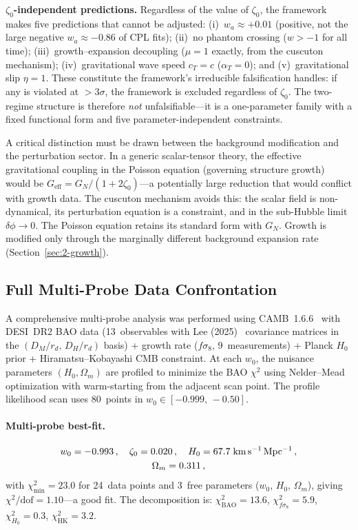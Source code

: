\textbf{$\zeta_0$-independent predictions.} Regardless of the value of $\zeta_0$, the framework makes five predictions that cannot be adjusted: (i)~$w_a \approx +0.01$ (positive, not the large negative $w_a \approx -0.86$ of CPL fits); (ii)~no phantom crossing ($w > -1$ for all time); (iii)~growth--expansion decoupling ($\mu = 1$ exactly, from the cuscuton mechanism); (iv)~gravitational wave speed $c_T = c$ ($\alpha_T = 0$); and (v)~gravitational slip $\eta = 1$. These constitute the framework's irreducible falsification handles: if any is violated at $>3\sigma$, the framework is excluded regardless of $\zeta_0$. The two-regime structure is therefore \emph{not} unfalsifiable---it is a one-parameter family with a fixed functional form and five parameter-independent constraints.

A critical distinction must be drawn between the background modification and the perturbation sector. In a generic scalar-tensor theory, the effective gravitational coupling in the Poisson equation (governing structure growth) would be $G_\mathrm{eff} = G_N/(1 + 2\zeta_0)$---a potentially large reduction that would conflict with growth data. The cuscuton mechanism avoids this: the scalar field is non-dynamical, its perturbation equation is a constraint, and in the sub-Hubble limit $\delta\phi \to 0$. The Poisson equation retains its standard form with $G_N$. Growth is modified only through the marginally different background expansion rate (Section~\ref{sec:2-growth}).

\subsection{Full Multi-Probe Data Confrontation}
\label{sec:2-multiprobe-full}

A comprehensive multi-probe analysis was performed using CAMB~1.6.6~\cite{ch2:Lewis2000} with DESI~DR2 BAO data (13~observables with Lee (2025)~\cite{ch2:Lee2025} covariance matrices in the $(D_M/r_d,\, D_H/r_d)$ basis) + growth rate ($f\sigma_8$, 9~measurements) + Planck $H_0$ prior + Hiramatsu--Kobayashi CMB constraint.  At each $w_0$, the nuisance parameters $(H_0, \Omega_m)$ are profiled to minimize the BAO $\chi^2$ using Nelder--Mead optimization with warm-starting from the adjacent scan point. The profile likelihood scan uses 80~points in $w_0 \in [-0.999,\, -0.50]$.

\paragraph{Multi-probe best-fit.}
\begin{gather}
w_0 = -0.993\,,\quad \zeta_0 = 0.020\,,\quad H_0 = 67.7\;\mathrm{km\,s^{-1}\,Mpc^{-1}}\,,\notag\\
\Omega_m = 0.311\,,
\label{eq:2-bestfit}
\end{gather}
with $\chi^2_\mathrm{min} = 23.0$ for 24~data points and 3~free parameters ($w_0$, $H_0$, $\Omega_m$), giving $\chi^2/\mathrm{dof} = 1.10$---a good fit.  The decomposition is: $\chi^2_\mathrm{BAO} = 13.6$, $\chi^2_{f\sigma_8} = 5.9$, $\chi^2_{H_0} = 0.3$, $\chi^2_\mathrm{HK} = 3.2$.

